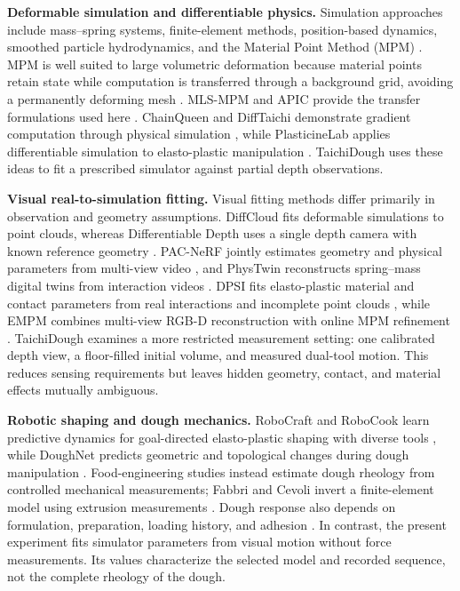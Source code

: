 \textbf{Deformable simulation and differentiable physics.}
Simulation approaches include mass--spring systems, finite-element methods, position-based dynamics, smoothed particle hydrodynamics, and the Material Point Method (MPM) \cite{arriola2020modeling,yin2021modeling,jiang2016mpm}. MPM is well suited to large volumetric deformation because material points retain state while computation is transferred through a background grid, avoiding a permanently deforming mesh \cite{jiang2016mpm}. MLS-MPM and APIC provide the transfer formulations used here \cite{hu2018mlsmpm,jiang2015apic}. ChainQueen and DiffTaichi demonstrate gradient computation through physical simulation \cite{hu2019chainqueen,hu2020difftaichi}, while PlasticineLab applies differentiable simulation to elasto-plastic manipulation \cite{huang2021plasticinelab}. TaichiDough uses these ideas to fit a prescribed simulator against partial depth observations.

\textbf{Visual real-to-simulation fitting.}
Visual fitting methods differ primarily in observation and geometry assumptions. DiffCloud fits deformable simulations to point clouds, whereas Differentiable Depth uses a single depth camera with known reference geometry \cite{sundaresan2022diffcloud,arnavaz2023diffdepth}. PAC-NeRF jointly estimates geometry and physical parameters from multi-view video \cite{li2023pacnerf}, and PhysTwin reconstructs spring--mass digital twins from interaction videos \cite{jiang2025phystwin}. DPSI fits elasto-plastic material and contact parameters from real interactions and incomplete point clouds \cite{yang2025dpsi}, while EMPM combines multi-view RGB-D reconstruction with online MPM refinement \cite{chen2026empm}. TaichiDough examines a more restricted measurement setting: one calibrated depth view, a floor-filled initial volume, and measured dual-tool motion. This reduces sensing requirements but leaves hidden geometry, contact, and material effects mutually ambiguous.

\textbf{Robotic shaping and dough mechanics.}
RoboCraft and RoboCook learn predictive dynamics for goal-directed elasto-plastic shaping with diverse tools \cite{shi2022robocraft,shi2023robocook}, while DoughNet predicts geometric and topological changes during dough manipulation \cite{bauer2024doughnet}. Food-engineering studies instead estimate dough rheology from controlled mechanical measurements; Fabbri and Cevoli invert a finite-element model using extrusion measurements \cite{fabbri2015dough}. Dough response also depends on formulation, preparation, loading history, and adhesion \cite{yazar2023doughreview,ghorbel2014adhesion}. In contrast, the present experiment fits simulator parameters from visual motion without force measurements. Its values characterize the selected model and recorded sequence, not the complete rheology of the dough.
